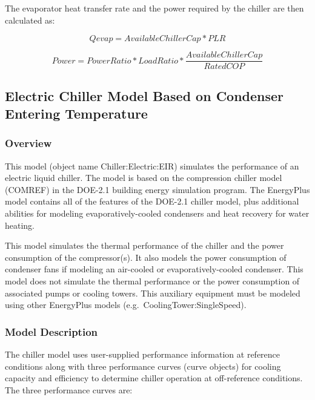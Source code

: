 The evaporator heat transfer rate and the power required by the chiller are then calculated as:

\begin{equation}
Qevap = AvailableChillerCap*PLR
\end{equation}

\begin{equation}
Power = PowerRatio*LoadRatio*\frac{{AvailableChillerCap}}{{RatedCOP}}
\end{equation}

\subsection{Electric Chiller Model Based on Condenser Entering Temperature}\label{electric-chiller-model-based-on-condenser-entering-temperature}

\subsubsection{Overview}\label{overview-2-003}

This model (object name Chiller:Electric:EIR) simulates the performance of an electric liquid chiller. The model is based on the compression chiller model (COMREF) in the DOE-2.1 building energy simulation program. The EnergyPlus model contains all of the features of the DOE-2.1 chiller model, plus additional abilities for modeling evaporatively-cooled condensers and heat recovery for water heating.

This model simulates the thermal performance of the chiller and the power consumption of the compressor(s). It also models the power consumption of condenser fans if modeling an air-cooled or evaporatively-cooled condenser. This model does not simulate the thermal performance or the power consumption of associated pumps or cooling towers. This auxiliary equipment must be modeled using other EnergyPlus models (e.g.~CoolingTower:SingleSpeed).

\subsubsection{Model Description}\label{model-description-2-003}

The chiller model uses user-supplied performance information at reference conditions along with three performance curves (curve objects) for cooling capacity and efficiency to determine chiller operation at off-reference conditions. The three performance curves are:

